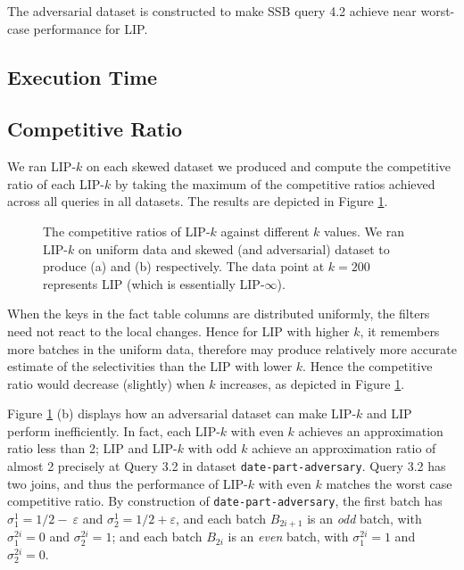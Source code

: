 The adversarial dataset is constructed to make SSB query 4.2 achieve near worst-case performance for LIP. 



\subsection{Execution Time}
\label{sec:time}



\subsection{Competitive Ratio}
\label{sec:ratio}

We ran LIP-$k$ on each skewed dataset we produced and compute the competitive ratio of each LIP-$k$ by taking the maximum of the competitive ratios achieved across all queries in all datasets. The results are depicted in Figure \ref{fig:cr}. 

\begin{figure}
    \centering
    \quad
    \caption{The competitive ratios of LIP-$k$ against different $k$ values. We ran LIP-$k$ on uniform data and skewed (and adversarial) dataset to produce (a) and (b) respectively. The data point at $k = 200$ represents LIP (which is essentially LIP-$\infty$).}
    \label{fig:cr}
\end{figure}

When the keys in the fact table columns are distributed uniformly, the filters need not react to the local changes. Hence for LIP with higher $k$, it remembers more batches in the uniform data, therefore may produce relatively more accurate estimate of the selectivities than the LIP with lower $k$. Hence the competitive ratio would decrease (slightly) when $k$ increases, as depicted in Figure \ref{fig:cr}.  

Figure \ref{fig:cr} (b) displays how an adversarial dataset can make LIP-$k$ and LIP perform inefficiently. In fact, each LIP-$k$ with even $k$ achieves an approximation ratio less than 2; LIP and LIP-$k$ with odd $k$ achieve an approximation ratio of almost 2 precisely at Query 3.2 in dataset \texttt{date-part-adversary}. Query 3.2 has two joins, and thus the performance of LIP-$k$ with even $k$ matches the worst case competitive ratio. By construction of \texttt{date-part-adversary}, the first batch has $\sigma^{1}_{1} = 1/2-\
\varepsilon$ and $\sigma^{1}_{2} = 1/2+\varepsilon$, and  each batch $B_{2i+1}$ is an \textit{odd} batch, with $\sigma^{2i}_{1} = 0$ and $\sigma^{2i}_{2} = 1$; and each batch $B_{2i}$ is an \textit{even} batch, with $\sigma^{2i}_{1} = 1$ and $\sigma^{2i}_{2} = 0$. 

